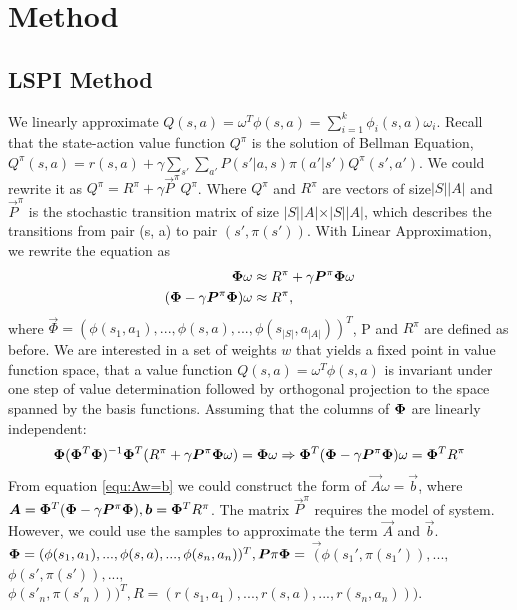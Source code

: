\section{Method}
\subsection{LSPI Method}
We linearly approximate $Q(s, a) = \omega^T \phi (s, a) = \sum_{i=1}^k \phi_i (s, a) \omega_i $. Recall that the state-action value function $Q^\pi$ is the solution of Bellman Equation, $Q^\pi(s, a) = r(s, a) + \gamma \sum_{s'} \sum_{a'} P(s' \vert a, s) \pi(a' \vert s') Q^\pi(s', a')$. We could rewrite it as 
$Q^\pi = R^\pi + \gamma \vec{P}^\pi Q^\pi$. Where $Q^\pi$ and $R^\pi$ are vectors of size$\vert S \vert \vert A \vert$ and $\vec{P}^\pi$ is the stochastic transition matrix of size $\vert S \vert \vert A \vert \times \vert S \vert \vert A \vert$, which describes the transitions from pair (s, a) to pair $(s', \pi (s') )$.  With Linear Approximation, we rewrite the equation as \\
\begin{align}
\vec \Phi \omega &\approx R^\pi + \gamma \vec{P}^\pi \vecPhi \omega\\
(\vec \Phi - \gamma \vec{P}^\pi \vecPhi) \omega &\approx R^\pi ,
\end{align}
where $\vec \Phi = ( \phi(s_1, a_1), ..., \phi(s, a), ..., \phi(s_{\vert S \vert}, a_{\vert A \vert}))^T$, P and $R^\pi$ are defined as before. We are interested in a set of weights $w$ that yields a fixed point in value function space, that a value function $Q(s, a) = \omega^T \phi (s, a)$ is invariant under one step of value determination followed by orthogonal projection to the space spanned by the basis functions\cite{lagoudakis2003least}. Assuming that the columns of $\vecPhi$ are linearly independent:
\begin{align}
\vecPhi ( \vecPhi^T \vecPhi)^{-1}\vecPhi^T (R^\pi + \gamma \vec{P} ^{\pi}\vecPhi \omega) = \vecPhi \omega \Rightarrow \vecPhi^T (\vec \Phi - \gamma \vec{P}^\pi \vecPhi) \omega = \vecPhi^T R^\pi \label{equ:Aw=b}
\end{align}
From equation \eqref{equ:Aw=b} we could construct the form of $\vec A \omega = \vec{b}$, where $\vec{A} =\vecPhi^T (\vec \Phi - \gamma \vec{P}^\pi \vecPhi), \vec{b} = \vecPhi^T R^\pi$. The matrix $\vec{P}^\pi$ requires the model of system. However, we could use the samples to approximate the term $\vec{A}$ and $\vec{b}$. $\vec{\Phi}= ( \phi(s_1, a_1), ..., \phi(s, a), ..., \phi(s_n, a_n) )^T, \vec{P}\pi \vecPhi = $ $ \vec  ( \phi(s_1', \pi(s_1')), ..., $ $\phi(s', \pi(s')), ..., $ \\ $\phi(s'_{n}, \pi(s'_{n})))^T, R = (r(s_1, a_1), ..., r(s, a), ..., r(s_n, a_n)))$. 
